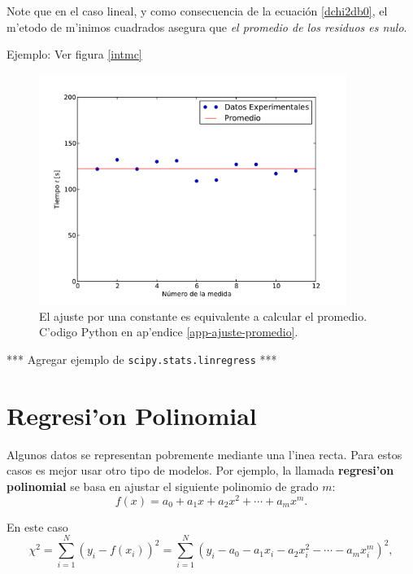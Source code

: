 Note que en el caso lineal, y como consecuencia de la ecuación \eqref{dchi2db0}, el m'etodo de m'inimos cuadrados asegura que \textit{el promedio de los residuos es nulo}.

Ejemplo: Ver figura \ref{intmc}


\begin{figure}[h!]
\begin{center}
\includegraphics[width=10cm]{figs/fig-ajuste-promedio.pdf}
\caption{El ajuste por una constante es equivalente a calcular el promedio. C'odigo Python en ap'endice \ref{app-ajuste-promedio}.}
\end{center}
\end{figure}

*** Agregar ejemplo de \texttt{scipy.stats.linregress} ***

\section{Regresi'on Polinomial}

Algunos datos se representan pobremente mediante una l'inea recta. Para estos casos es mejor usar otro tipo de modelos. Por ejemplo, la llamada \textbf{regresi'on polinomial} se basa en ajustar el siguiente polinomio de grado $m$:
\begin{equation}
f(x) = a_0+a_1x+a_2x^2+\cdots + a_mx^m.
\end{equation}

En este caso
\begin{equation}\label{Srpol}
\chi^2 = \sum_{i=1}^N\left(y_i-f(x_i)\right)^2=\sum_{i=1}^N\left(y_i-a_0-a_1x_i-a_2x_i^2-\cdots - a_mx_i^m\right)^2,
\end{equation}

